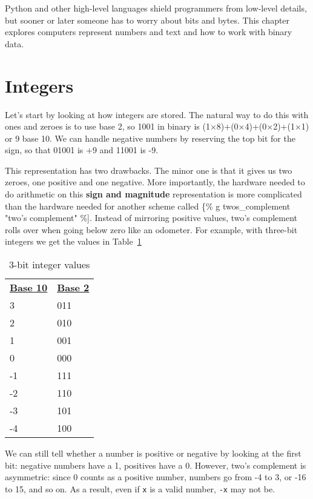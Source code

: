 \documentclass{scrbook}
\newcommand{\tblref}[1]{Table~\ref{#1}}
\newcommand{\glossref}[1]{\textbf{#1}}
\begin{document}
Python and other high-level languages shield programmers from low-level details,
but sooner or later someone has to worry about bits and bytes.
This chapter explores computers represent numbers and text
and how to work with binary data.

\section{Integers}\label{binary-int}


Let's start by looking at how integers are stored.
The natural way to do this with ones and zeroes is to use base 2,
so 1001 in binary is (1×8)+(0×4)+(0×2)+(1×1) or 9 base 10.
We can handle negative numbers by reserving the top bit for the sign,
so that 01001 is +9 and 11001 is -9.


This representation has two drawbacks.
The minor one is that it gives us two zeroes,
one positive and one negative.
More importantly,
the hardware needed to do arithmetic
on this \glossref{sign and magnitude} representation
is more complicated than the hardware needed for another scheme
called \{\% g twos\_complement "two's complement" \%].
Instead of mirroring positive values,
two's complement rolls over when going below zero like an odometer.
For example,
with three-bit integers we get the values in \tblref{binary-3bit}

\begin{table}
\begin{tabular}{ll}
\textbf{\underline{Base 10}} & \textbf{\underline{Base 2}} \\
3 & 011 \\
2 & 010 \\
1 & 001 \\
0 & 000 \\
-1 & 111 \\
-2 & 110 \\
-3 & 101 \\
-4 & 100 \\
\end{tabular}
\caption{3-bit integer values}
\label{binary-3bit}
\end{table}



We can still tell whether a number is positive or negative
by looking at the first bit:
negative numbers have a 1, positives have a 0.
However,
two's complement is asymmetric:
since 0 counts as a positive number,
numbers go from -4 to 3, or -16 to 15, and so on.
As a result,
even if \texttt{x} is a valid number,
\texttt{-x} may not be.
\end{document}
